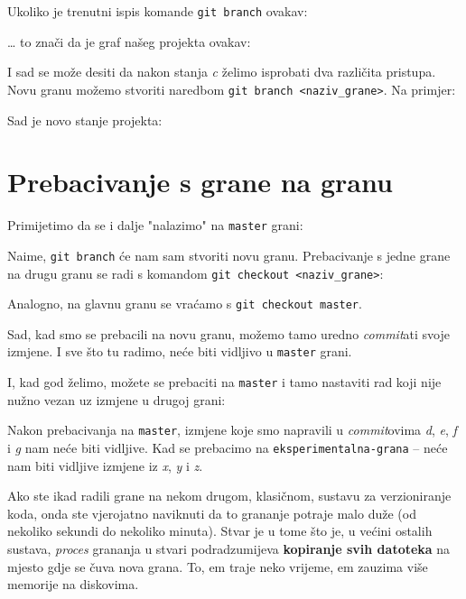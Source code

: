 Ukoliko je trenutni ispis komande \verb+git branch+ ovakav:



\dots{} to znači da je graf našeg projekta ovakav:



I sad se može desiti da nakon stanja \emph c želimo isprobati dva različita pristupa.
Novu granu možemo stvoriti naredbom \verb+git branch <naziv_grane>+.
Na primjer:


Sad je novo stanje projekta:



\section*{Prebacivanje s grane na granu}

Primijetimo da se i dalje "nalazimo" na \verb+master+ grani:



Naime, \verb+git branch+ će nam sam stvoriti novu granu.
Prebacivanje s jedne grane na drugu granu se radi s komandom \verb+git checkout <naziv_grane>+:



Analogno, na glavnu granu se vraćamo s \verb+git checkout master+.

Sad, kad smo se prebacili na novu granu, možemo tamo uredno \emph{commit}ati svoje izmjene. 
I sve što tu radimo, neće biti vidljivo u \verb+master+ grani.



I, kad god želimo, možete se prebaciti na \verb+master+ i tamo nastaviti rad koji nije nužno vezan uz izmjene u drugoj grani:



Nakon prebacivanja na \verb+master+, izmjene koje smo napravili u \emph{commit}ovima \emph d, \emph e, \emph f i \emph g nam neće biti vidljive.
Kad se prebacimo na \verb+eksperimentalna-grana+ -- neće nam biti vidljive izmjene iz \emph x, \emph y i \emph z.

Ako ste ikad radili grane na nekom drugom, klasičnom, sustavu za verzioniranje koda, onda ste vjerojatno naviknuti da to grananje potraje malo duže (od nekoliko sekundi do nekoliko minuta).
Stvar je u tome što je, u većini ostalih sustava, \emph{proces} grananja u stvari podradzumijeva \textbf{kopiranje svih datoteka} na mjesto gdje se čuva nova grana.
To, em traje neko vrijeme, em zauzima više memorije na diskovima.

